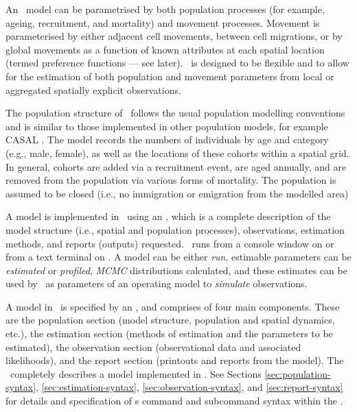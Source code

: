 An \SPM\ model can be parametrised by both population processes (for example, ageing, recruitment, and mortality) and movement processes. Movement is parameterised by either adjacent cell movements, between cell migrations, or by global movements as a function of known attributes at each spatial location (termed preference functions --- see later). \SPM\ is designed to be flexible and to allow for the estimation of both population and movement parameters from local or aggregated spatially explicit observations. 

The population structure of \SPM\ follows the usual population modelling conventions and is similar to those implemented in other population models, for example CASAL  \citep{1388}. The model records the numbers of individuals by age and category (e.g., male, female), as well as the locations of these cohorts within a spatial grid. In general, cohorts are added via a recruitment event, are aged annually, and are removed from the population via various forms of mortality. The population is assumed to be closed (i.e., no immigration or emigration from the modelled area)

A model is implemented in \SPM\ using an \config {}, which is a complete description of the model structure (i.e., spatial and population processes), observations, estimation methods, and reports (outputs) requested. \SPM\ runs from a console window on  or from a text terminal on . A model can be either \emph{run}, estimable parameters can be \emph{estimated} or \emph{profiled}, \emph{MCMC} distributions calculated, and these estimates can be %
used by \SPM\ as parameters of an operating model to \emph{simulate} observations.

A model in \SPM\ is specified by an \config, and comprises of four main components. These are the population section (model structure, population and spatial dynamics, etc.), the estimation section (methods of estimation and the parameters to be estimated), the observation section (observational data and associated likelihoods), and the report section (printouts and reports from the model). The \config\  completely describes a model implemented in \SPM. See Sections \ref{sec:population-syntax}, \ref{sec:estimation-syntax}, \ref{sec:observation-syntax}, and \ref{sec:report-syntax} for details and specification of \SPM s command and subcommand syntax within the \config. 


